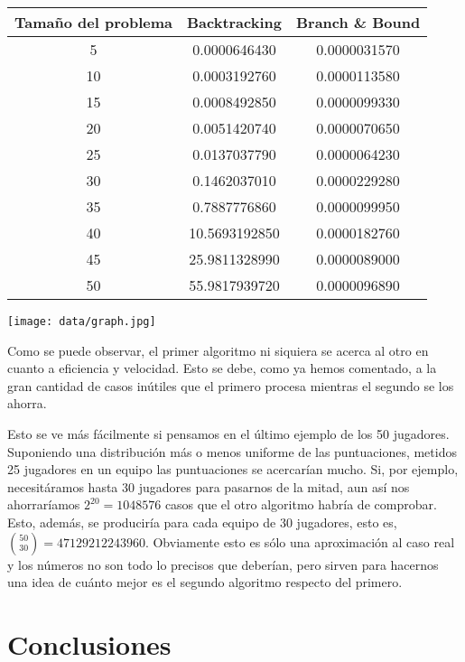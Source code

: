 \documentclass[a4paper, 11pt]{article}
\begin{document}
\begin{center}
\begin{tabular}{|c|c|c|}

\hline
Tamaño del problema & Backtracking & Branch \& Bound \\
\hline
\hline
5 & 0.0000646430 & 0.0000031570 \\
\hline
10 & 0.0003192760 & 0.0000113580 \\
\hline
15 & 0.0008492850 & 0.0000099330 \\
\hline
20 & 0.0051420740 & 0.0000070650 \\
\hline
25 & 0.0137037790 & 0.0000064230 \\
\hline
30 & 0.1462037010 & 0.0000229280 \\
\hline
35 & 0.7887776860 & 0.0000099950 \\
\hline
40 & 10.5693192850 & 0.0000182760 \\
\hline
45 & 25.9811328990 & 0.0000089000 \\
\hline
50 & 55.9817939720 & 0.0000096890 \\
\hline
\end{tabular}
\end{center}

\texttt{[image: data/graph.jpg]}

Como se puede observar, el primer algoritmo ni siquiera se acerca al otro en cuanto
a eficiencia y velocidad. Esto se debe, como ya hemos comentado, a la gran cantidad
de casos inútiles que el primero procesa mientras el segundo se los ahorra.

Esto se ve más fácilmente si pensamos en el último ejemplo de los 50 jugadores.
Suponiendo una distribución más o menos uniforme de las puntuaciones, metidos 25 jugadores
en un equipo las puntuaciones se acercarían mucho. Si, por ejemplo, necesitáramos hasta
30 jugadores para pasarnos de la mitad, aun así nos ahorraríamos $2^{20} = 1048576$ casos
que el otro algoritmo habría de comprobar. Esto, además, se produciría para cada
equipo de 30 jugadores, esto es, ${50 \choose 30} = 47129212243960$. Obviamente esto es 
sólo una aproximación al caso real y los números no son todo lo precisos que deberían,
pero sirven para hacernos una idea de cuánto mejor es el segundo algoritmo respecto del
primero.

\section{Conclusiones}
\end{document}
